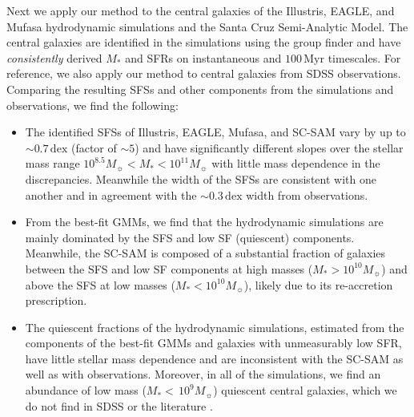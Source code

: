 \documentclass[tighten, preprint]{aastex62}
\begin{document}
Next we apply our method to the central galaxies of the Illustris, EAGLE, 
and {\sc Mufasa} hydrodynamic simulations and the Santa 
Cruz Semi-Analytic Model. The central galaxies are identified in the  
simulations using the \cite{tinker2011} group 
finder and have \emph{consistently} derived $M_*$ and SFRs on instantaneous 
and $100\,\mathrm{Myr}$ timescales. For reference, we also apply our 
method to central galaxies from SDSS observations. Comparing the resulting 
SFSs and other components from the simulations and observations, we find the following:

\begin{itemize}
\item The identified SFSs of Illustris, EAGLE, {\sc Mufasa}, and SC-SAM 
vary by up to ${\sim}0.7\,\mathrm{dex}$ (factor of ${\sim}5$) 
and have significantly different slopes over the stellar mass
range $10^{8.5} M_\sun < M_* < 10^{11} M_\sun$ with little mass
dependence in the discrepancies. Meanwhile the width of the SFSs 
are consistent with one another and in agreement with the 
$\sim 0.3\,\mathrm{dex}$ width from observations.

\item From the best-fit GMMs, we find that the hydrodynamic simulations are 
mainly dominated by the SFS and low SF (quiescent) components. Meanwhile,
the SC-SAM is composed of a substantial fraction of galaxies between the 
SFS and low SF components at high masses ($M_* > 10^{10}M_\sun$) and above 
the SFS at low masses ($M_* < 10^{10}M_\sun$), likely due to its 
re-accretion prescription. 

\item The quiescent fractions of the hydrodynamic simulations, estimated 
from the components of the best-fit GMMs and galaxies with unmeasurably 
low SFR, have little stellar mass dependence and are inconsistent 
with the SC-SAM as well as with observations. Moreover, in all of 
the simulations, we find an abundance of low mass ($M_*{<}\,10^9M_\sun$)
quiescent central galaxies, which we do not find in SDSS or the literature .
\end{itemize}
\end{document}
